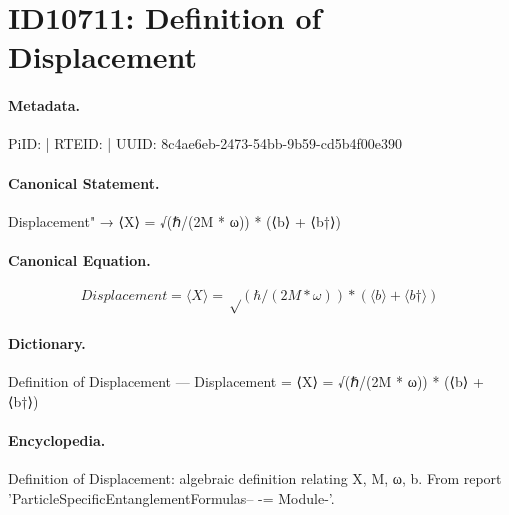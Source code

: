 \section*{ID10711: Definition of Displacement}
\paragraph{Metadata.}
PiID:  | RTEID:  | UUID: 8c4ae6eb-2473-54bb-9b59-cd5b4f00e390

\paragraph{Canonical Statement.}
Displacement" → ⟨X⟩ = √(ℏ/(2M * ω)) * (⟨b⟩ + ⟨b†⟩)

\paragraph{Canonical Equation.}
\[
Displacement = ⟨X⟩ = √(ℏ/(2M * ω)) * (⟨b⟩ + ⟨b†⟩)
\]

\paragraph{Dictionary.}
Definition of Displacement — Displacement = ⟨X⟩ = √(ℏ/(2M * ω)) * (⟨b⟩ + ⟨b†⟩)

\paragraph{Encyclopedia.}
Definition of Displacement: algebraic definition relating X, M, ω, b. From report 'ParticleSpecificEntanglementFormulas-- -= Module-'.
